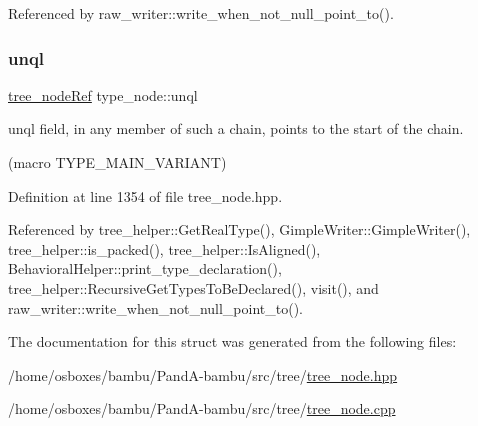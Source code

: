 Referenced by raw\+\_\+writer\+::write\+\_\+when\+\_\+not\+\_\+null\+\_\+point\+\_\+to().

\mbox{\label{structtype__node_aed3c94fa146e1d1f3df575ca18447b97}} 
\subsubsection{\texorpdfstring{unql}{unql}}
{\footnotesize\ttfamily \hyperlink{tree__node_8hpp_a6ee377554d1c4871ad66a337eaa67fd5}{tree\+\_\+node\+Ref} type\+\_\+node\+::unql}



unql field, in any member of such a chain, points to the start of the chain. 

(macro T\+Y\+P\+E\+\_\+\+M\+A\+I\+N\+\_\+\+V\+A\+R\+I\+A\+NT) 

Definition at line 1354 of file tree\+\_\+node.\+hpp.



Referenced by tree\+\_\+helper\+::\+Get\+Real\+Type(), Gimple\+Writer\+::\+Gimple\+Writer(), tree\+\_\+helper\+::is\+\_\+packed(), tree\+\_\+helper\+::\+Is\+Aligned(), Behavioral\+Helper\+::print\+\_\+type\+\_\+declaration(), tree\+\_\+helper\+::\+Recursive\+Get\+Types\+To\+Be\+Declared(), visit(), and raw\+\_\+writer\+::write\+\_\+when\+\_\+not\+\_\+null\+\_\+point\+\_\+to().



The documentation for this struct was generated from the following files\+:\begin{DoxyCompactItemize}
\item 
/home/osboxes/bambu/\+Pand\+A-\/bambu/src/tree/\hyperlink{tree__node_8hpp}{tree\+\_\+node.\+hpp}\item 
/home/osboxes/bambu/\+Pand\+A-\/bambu/src/tree/\hyperlink{tree__node_8cpp}{tree\+\_\+node.\+cpp}\end{DoxyCompactItemize}
